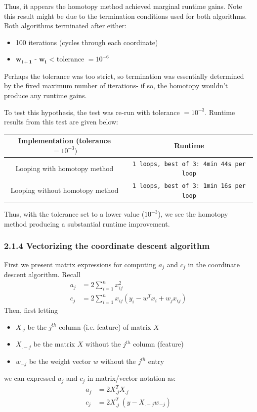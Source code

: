 \documentclass[paper=a4, fontsize=11pt]{scrartcl} %
\numberwithin{equation}{section} %
\numberwithin{figure}{section} %
\numberwithin{table}{section} %
\begin{document}
Thus, it appears the homotopy method achieved marginal runtime gains. Note this result might be due to the termination conditions used for both algorithms. Both algorithms terminated after either:
\begin{itemize}
\item 100 iterations (cycles through each coordinate)
\item $\bm{w_{i+1}}$ - $\bm{w_{i}}$ < tolerance $= 10^{-6}$
\end{itemize}
Perhaps the tolerance was too strict, so termination was essentially determined by the fixed maximum number of iterations- if so, the homotopy wouldn't produce any runtime gains.

To test this hypothesis, the test was re-run with tolerance $=  10^{-3}$. Runtime results from this test are given below:

\begin{center}
\begin{tabular}{| c | c |}
\hline
	\textbf{Implementation (tolerance $= 10^{-3}) $ } & \textbf{Runtime}\\
\hline
	Looping with homotopy method & \texttt{1 loops, best of 3: 4min 44s per loop} \\
\hline
	Looping without homotopy method &  \texttt{1 loops, best of 3: 1min 16s per loop} \\
\hline
\end{tabular}
\end{center}

Thus, with the tolerance set to a lower value ($10^{-3}$), we see the homotopy method producing a substantial runtime improvement.

\subsubsection*{2.1.4 Vectorizing the coordinate descent algorithm}

First we present matrix expressions for computing $a_j$ and $c_j$ in the coordinate descent algorithm. Recall
\begin{align*}
a_j &= 2 \sum_{i=1}^n x_{ij}^2 \\
c_j &= 2  \sum_{i=1}^n x_{ij} (y_i - w^T x_i + w_jx_{ij})
\end{align*}
Then, first letting
\begin{itemize}
\item ${X_{.j}}$ be the $j^{th}$ column (i.e. feature) of matrix $X$
\item $X_{.-j}$ be the matrix $X$ without the $j^{th}$ column (feature)
\item $w_{-j}$ be the weight vector $w$ without the $j^{th}$ entry
\end{itemize}
we can expressed $a_j$ and $c_j$ in matrix/vector notation as:
\begin{align*}
a_j &= 2 X_{.j}^T X_{.j} \\
c_j &= 2 X_{.j}^T\ (y - X_{.-j} w_{-j})
\end{align*}
\end{document}
